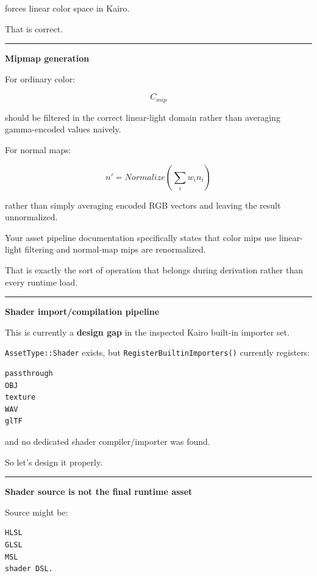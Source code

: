 forces linear color space in Kairo.

That is correct.

\begin{center}\rule{0.5\linewidth}{0.5pt}\end{center}

\textbf{Mipmap generation}

For ordinary color:

\[
C_{mip}
\]

should be filtered in the correct linear-light domain rather than averaging gamma-encoded values naively.

For normal maps:

\[
n'=
Normalize\left(
\sum_i w_i n_i
\right)
\]

rather than simply averaging encoded RGB vectors and leaving the result unnormalized.

Your asset pipeline documentation specifically states that color mips use linear-light filtering and normal-map mips are renormalized.

That is exactly the sort of operation that belongs during derivation rather than every runtime load.

\begin{center}\rule{0.5\linewidth}{0.5pt}\end{center}

\textbf{Shader import/compilation pipeline}

This is currently a \textbf{design gap} in the inspected Kairo built-in importer set.

\texttt{AssetType::Shader} exists, but \texttt{RegisterBuiltinImporters()} currently registers:

\begin{verbatim}
passthrough
OBJ
texture
WAV
glTF
\end{verbatim}

and no dedicated shader compiler/importer was found.

So let's design it properly.

\begin{center}\rule{0.5\linewidth}{0.5pt}\end{center}

\textbf{Shader source is not the final runtime asset}

Source might be:

\begin{verbatim}
HLSL
GLSL
MSL
shader DSL.
\end{verbatim}


